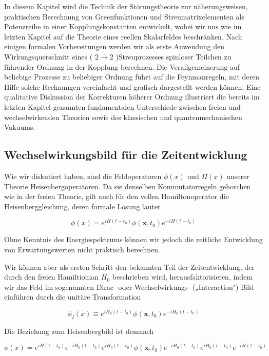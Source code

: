 \documentclass[10pt, letterpaper]{article}
\begin{document}
In diesem Kapitel wird die Technik der Störungstheorie zur näherungsweisen, praktischen Berechnung von Greenfunktionen und Streumatrixelementen als Potenzreihe in einer Kopplungskonstanten entwickelt, wobei wir uns wie im letzten Kapitel auf die Theorie eines reellen Skalarfeldes beschränken. Nach einigen formalen Vorbereitungen werden wir als erste Anwendung den Wirkungsquerschnitt eines ( $2 \rightarrow 2$ )Streuprozesses spinloser Teilchen zu führender Ordnung in der Kopplung berechnen. Die Verallgemeinerung auf beliebige Prozesse zu beliebiger Ordnung führt auf die Feynmanregeln, mit deren Hilfe solche Rechnungen vereinfacht und grafisch dargestellt werden können. Eine qualitative Diskussion der Korrekturen höherer Ordnung illustriert die bereits im letzten Kapitel genannten fundamentalen Unterschiede zwischen freien und wechselwirkenden Theorien sowie des klassischen und quantenmechanischen Vakuums.

\subsection*{Wechselwirkungsbild für die Zeitentwicklung}
Wie wir diskutiert haben, sind die Feldoperatoren $\phi(x)$ und $\Pi(x)$ unserer Theorie Heisenbergoperatoren. Da sie denselben Kommutatorregeln gehorchen wie in der freien Theorie, gilt auch für den vollen Hamiltonoperator die Heisenberggleichung, deren formale Lösung lautet

$$
\phi(x)=e^{i H\left(t-t_{0}\right)} \phi\left(\mathbf{x}, t_{0}\right) e^{-i H\left(t-t_{0}\right)}
$$

Ohne Kenntnis des Energiespektrums können wir jedoch die zeitliche Entwicklung von Erwartungswerten nicht praktisch berechnen.

Wir können aber als ersten Schritt den bekannten Teil der Zeitentwicklung, der durch den freien Hamiltionian $H_{0}$ beschrieben wird, herausfaktorisieren, indem wir das Feld im sogenannten Dirac- oder Wechselwirkungs- („Interaction") Bild einführen durch die unitäre Transformation

$$
\phi_{I}(x) \equiv e^{i H_{0}\left(t-t_{0}\right)} \phi\left(\mathbf{x}, t_{0}\right) e^{-i H_{0}\left(t-t_{0}\right)}
$$

Die Beziehung zum Heisenbergbild ist demnach

$$
\phi(x)=e^{i H\left(t-t_{0}\right)} e^{-i H_{0}\left(t-t_{0}\right)} e^{i H_{0}\left(t-t_{0}\right)} \phi\left(\mathbf{x}, t_{0}\right) e^{-i H_{0}\left(t-t_{0}\right)} e^{i H_{0}\left(t-t_{0}\right)} e^{-i H\left(t-t_{0}\right)}
$$
\end{document}
